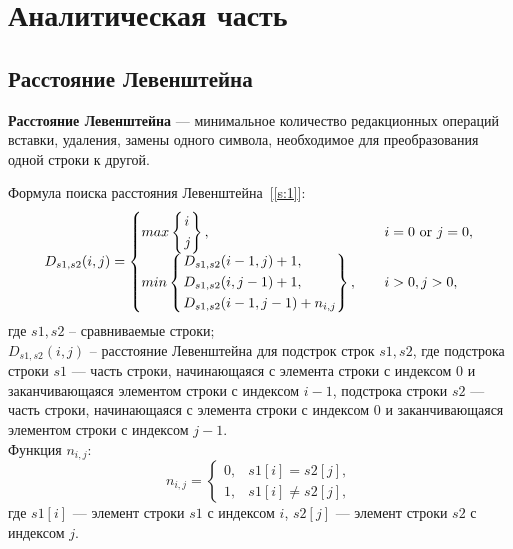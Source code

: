 \documentclass[14pt]{article}
\begin{document}
\newpage
\section{Аналитическая часть}
\subsection{Расстояние Левенштейна}
\textbf{Расстояние Левенштейна} --- минимальное количество редакционных операций вставки, удаления, замены одного символа, необходимое для преобразования одной строки к другой.

Формула поиска расстояния Левенштейна~[\ref{s:1}]:
\begin{equation}
D_{s1,s2}(i,j) = 
\begin{cases}\label{for:Lev}
max\begin{cases}
	\begin{rcases}
		i\\
		j\\
	\end{rcases},
\end{cases} & i = 0 $ or $ j = 0,\\
min \begin{cases}
    \begin{rcases}
        D_{s1,s2}(i-1, j) + 1,\\
        D_{s1,s2}(i, j-1) + 1,\\
        D_{s1,s2}(i-1, j-1) + n_{i,j}\\
    \end{rcases},
\end{cases} & i > 0, j > 0,
\end{cases}
\end{equation}
где $s1, s2$ -- сравниваемые строки;\\
$D_{s1,s2}(i,j)$ -- расстояние Левенштейна для подстрок строк $s1, s2$, где подстрока строки $s1$ --- часть строки, начинающаяся с элемента строки с индексом $0$ и заканчивающаяся элементом строки с индексом $i - 1$, подстрока строки $s2$ --- часть строки, начинающаяся с элемента строки с индексом $0$ и заканчивающаяся элементом строки с индексом $j - 1$.\\
Функция $n_{i,j}$:
\begin{equation}\label{for: cas1}
n_{i, j} = 
    \begin{cases}
        0, & s1[i] = s2[j], \\
        1, & s1[i] \neq s2[j],
    \end{cases}
\end{equation}
где $s1[i]$ --- элемент строки $s1$ с индексом $i$, $s2[j]$ --- элемент строки $s2$ с индексом $j$.
\end{document}
